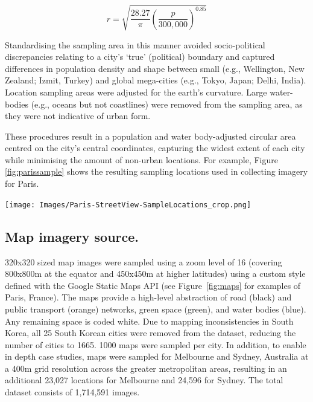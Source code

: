 \documentclass{nature}
\makeatletter
\renewenvironment*{figure}{\@float{figure}}{\end@float}
\makeatother
\begin{document}
\begin{methods}
\begin{equation}
r = \sqrt{ \frac{28.27}{\pi} \left( \frac{p}{300,000}  \right) ^{0.85} }
\end{equation}


Standardising the sampling area in this manner avoided socio-political discrepancies relating to a city's `true' (political) boundary and captured differences in population density and shape between small (e.g., Wellington, New Zealand; Izmit, Turkey) and global mega-cities (e.g., Tokyo, Japan;  Delhi, India). Location sampling areas were adjusted for the earth's curvature\cite{Sinnott1984}. Large water-bodies (e.g., oceans but not coastlines) were removed from the sampling area, as they were not indicative of urban form. 

These procedures result in a population and water body-adjusted circular area centred on the city's central coordinates, capturing the widest extent of each city while minimising the amount of non-urban locations. For example, Figure \ref{fig:parissample} shows the resulting sampling locations used in collecting imagery for Paris. 

\begin{figure}
    \centering    
\texttt{[image: Images/Paris-StreetView-SampleLocations\_crop.png]}  
\caption{\bf Sampling locations for map imagery (from Paris, France)\cite{GoogleStatic2017}.}    
 \label{fig:parissample}  
\end{figure} 



\subsection{Map imagery source.}\label{methodsimagery}

320x320 sized map images were sampled using a zoom level of 16 (covering 800x800m at the equator and 450x450m at higher latitudes) using a custom style defined with the Google Static Maps API\cite{GoogleStatic2017} (see Figure~\ref{fig:maps} for examples of Paris, France). The maps provide a high-level abstraction of road (black) and public transport (orange) networks, green space (green), and water bodies (blue). Any remaining space is coded white. Due to mapping inconsistencies in South Korea, all 25 South Korean cities were removed from the dataset, reducing the number of cities to 1665. 1000 maps were sampled per city. In addition, to enable in depth case studies, maps were sampled for Melbourne and Sydney, Australia at a 400m grid resolution across the greater metropolitan areas, resulting in an additional 23,027 locations for Melbourne and 24,596 for Sydney. The total dataset consists of 1,714,591 images.




\end{methods}
\end{document}
